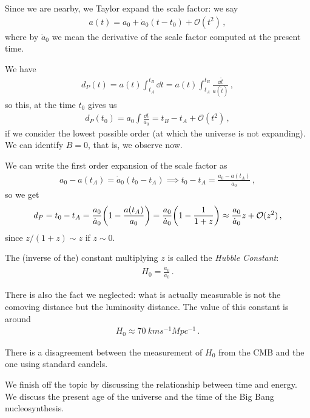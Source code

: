 \documentclass[main.tex]{subfiles}
\begin{document}
Since we are nearby, we Taylor expand the scale factor: we say 
%
\begin{align}
a(t) = a_0 + \dot{a}_{0} (t - t_0 ) + \mathcal{O}(t^2)
\,,
\end{align}
%
where by \(\dot{a}_{0}\) we mean the derivative of the scale factor computed at the present time.

We have 
%
\begin{align}
d_{P}(t) = a(t) \int_{t_{A}}^{t_B} \dd{t} = a(t) \int_{t_A}^{t_B} \frac{ \dd{\widetilde{t}}}{a (\widetilde{t})}
\,,
\end{align}
%
so this, at the time \(t_0\) gives us 
%
\begin{align}
d_P (t_0 ) = a_0 \int \frac{\dd{t}}{a_0 } = t_B - t_A + \mathcal{O}(t^2)
\,,
\end{align}
%
if we consider the lowest possible order (at which the universe is not expanding).
We can identify \(B = 0\), that is, we observe now.

We can write the first order expansion of the scale factor as 
%
\begin{align}
a_0 - a(t_A) = \dot{a}_{0} (t_0 - t_A) \implies
t_{0} - t_A = \frac{a_0 - a(t_A)}{\dot{a}_{0}}
\,,
\end{align}
%
so we get 
%
\begin{align}
d_P = t_0 - t_A = \frac{a_0 }{\dot{a}_{0}} \qty(1 - \frac{a(t_A)}{a_0 }) 
= \frac{a_0 }{\dot{a}_{0}} \qty(1 - \frac{1}{1+z})
\approx \frac{a_0 }{ \dot{a}_{0}} z + \mathcal{O} (z^2)
\,,
\end{align}
%
since \(z / (1+z) \sim z \) if \(z \sim 0\). 

The (inverse of the) constant multiplying \(z\) is called the \emph{Hubble Constant}: 
%
\begin{align}
H_0 = \frac{\dot{a}_{0}}{a_0 }
\,.
\end{align}

There is also the fact we neglected: what is actually measurable is not the comoving distance but the luminosity distance. 
The value of this constant is around 
%
\begin{align}
H_0 \approx \SI{70}{km s^{-1} Mpc^{-1}}
\,.
\end{align}

There is a disagreement between the measurement of \(H_0 \) from the CMB and the one using standard candels. 

We finish off the topic by discussing the relationship between time and energy. We discuss the present age of the universe and the time of the Big Bang nucleosynthesis. 
\end{document}
